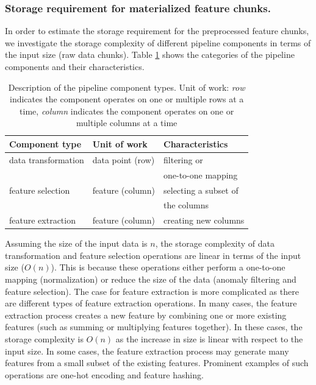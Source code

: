 \subsubsection{Storage requirement for materialized feature chunks.} 
In order to estimate the storage requirement for the preprocessed feature chunks, we investigate the storage complexity of different pipeline components in terms of the input size (raw data chunks).
Table \ref{pipeline-component-description} shows the categories of the pipeline components and their characteristics.
\begin{table}[h!]
\centering
\begin{tabular}{lll}
\hline
\textbf{Component type}  & \textbf{Unit of work} &\textbf{Characteristics}  \\
\hline
data transformation			& data point (row)       	  & filtering or        \\
			&  	  &  one-to-one mapping        \\
feature selection            & feature (column)             & selecting a subset of   \\
			&  	  &   the columns        \\
feature extraction & feature (column) & creating new columns \\
\hline
\end{tabular}
\caption{Description of the pipeline component types. Unit of work: \textit{row} indicates the component operates on one or multiple rows at a time, \textit{column} indicates the component operates on one or multiple columns at a time}  
\label{pipeline-component-description}
\end{table}
Assuming the size of the input data is $n$, the storage complexity of data transformation and feature selection operations are linear in terms of the input size ($O(n)$).
This is because these operations either perform a one-to-one mapping (normalization) or reduce the size of the data (anomaly filtering and feature selection).
The case for feature extraction is more complicated as there are different types of feature extraction operations.
In many cases, the feature extraction process creates a new feature by combining one or more existing features (such as summing or multiplying features together).
In these cases, the storage complexity is $O(n)$ as the increase in size is linear with respect to the input size.
In some cases, the feature extraction process may generate many features from a small subset of the existing features.
Prominent examples of such operations are one-hot encoding and feature hashing.
